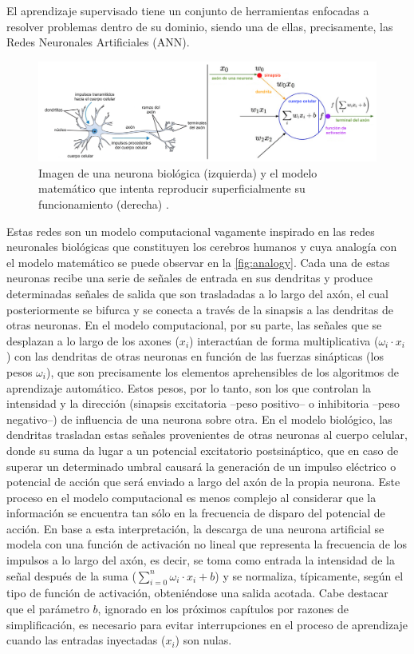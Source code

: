 El aprendizaje supervisado tiene un conjunto de herramientas enfocadas a resolver problemas dentro de su dominio, siendo una de ellas, precisamente, las Redes Neuronales Artificiales (ANN).

\begin{figure}
    \centering
    \includegraphics[width=\textwidth]{Images/analogy-neuron.png}
    \caption{Imagen de una neurona biológica (izquierda) y el modelo matemático que intenta reproducir superficialmente su funcionamiento (derecha) \cite{CS231n}.}
    \label{fig:analogy}
\end{figure}

Estas redes son un modelo computacional vagamente inspirado en las redes neuronales biológicas que constituyen los cerebros humanos \cite{ANN} y cuya analogía con el modelo matemático se puede observar en la \autoref{fig:analogy}. Cada una de estas neuronas recibe una serie de señales de entrada en sus dendritas y produce determinadas señales de salida que son trasladadas a lo largo del axón, el cual posteriormente se bifurca y se conecta a través de la sinapsis a las dendritas de otras neuronas. En el modelo computacional, por su parte, las señales que se desplazan a lo largo de los axones ($x_i$) interactúan de forma multiplicativa ($\omega_i\cdot x_i$) con las dendritas de otras neuronas en función de las fuerzas sinápticas (los pesos $\omega_i$), que son precisamente los elementos aprehensibles de los algoritmos de aprendizaje automático. Estos pesos, por lo tanto, son los que controlan la intensidad y la dirección (sinapsis excitatoria --peso positivo-- o inhibitoria --peso negativo--) de influencia de una neurona sobre otra. En el modelo biológico, las dendritas trasladan estas señales provenientes de otras neuronas al cuerpo celular, donde su suma da lugar a un potencial excitatorio postsináptico, que en caso de superar un determinado umbral causará la generación de un impulso eléctrico o potencial de acción que será enviado a largo del axón de la propia neurona. Este proceso en el modelo computacional es menos complejo al considerar que la información se encuentra tan sólo en la frecuencia de disparo del potencial de acción. En base a esta interpretación, la descarga de una neurona artificial se modela con una función de activación no lineal que representa la frecuencia de los impulsos a lo largo del axón, es decir, se toma como entrada la intensidad de la señal después de la suma ($\sum\limits_{i=0}^n \omega_i\cdot x_i + b$) y se normaliza, típicamente, según el tipo de función de activación, obteniéndose una salida acotada. Cabe destacar que el parámetro $b$, ignorado en los próximos capítulos por razones de simplificación, es necesario para evitar interrupciones en el proceso de aprendizaje cuando las entradas inyectadas ($x_i$) son nulas.

